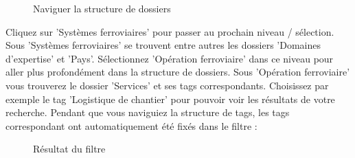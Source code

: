 \begin{figure}[H]
\caption{Naviguer la structure de dossiers}
\end{figure}

Cliquez sur 'Systèmes ferroviaires'  pour passer au prochain niveau / sélection. Sous 'Systèmes ferroviaires' se trouvent entre autres les dossiers 'Domaines d'expertise' et 'Pays'. Sélectionnez 'Opération ferroviaire'  dans ce niveau pour aller plus profondément dans la structure de dossiers. Sous 'Opération ferroviaire' vous trouverez le dossier 'Services' et ses tags correspondants. Choisissez par exemple le tag 'Logistique de chantier'  pour pouvoir voir les résultats de votre recherche. Pendant que vous naviguiez la structure de tags, les tags correspondant ont automatiquement été fixés dans le filtre :

\begin{figure}[H]
\caption{Résultat du filtre}
\end{figure}

